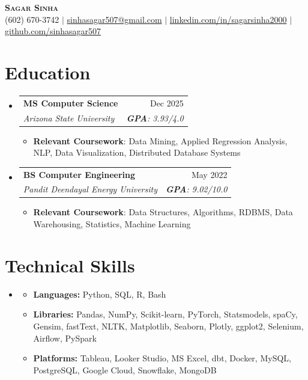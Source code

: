 \documentclass[letterpaper,9pt]{article}
\makeatletter
\newcommand{\resumeItem}[1]{
  \item\small{
    {#1 \vspace{-2pt}}
  }
}
\newcommand{\resumeSubheading}[4]{
  \vspace{-2pt}\item
    \begin{tabular*}{0.97\textwidth}[t]{l@{\extracolsep{\fill}}r}
      \textbf{#1} & {\small #2} \\
      \textit{\small#3} & \textit{\small #4} \\
    \end{tabular*}\vspace{-7pt}
}
\newcommand{\resumeSubHeadingListStart}{\begin{itemize}[leftmargin=0.15in, label={}]}
\newcommand{\resumeSubHeadingListEnd}{\end{itemize}}
\newcommand{\resumeItemListStart}{\begin{itemize}}
\newcommand{\resumeItemListEnd}{\end{itemize}\vspace{-5pt}}
\makeatother
\begin{document}
\vspace*{-10pt} 
\begin{center}
    \textbf{\Huge \scshape Sagar Sinha} \\ \vspace{4pt}
    \small (602) 670-3742 $|$
    \href{mailto:sinhasagar507@gmail.com}{sinhasagar507@gmail.com} $|$
    \href{https://linkedin.com/in/sagarsinha2000}{linkedin.com/in/sagarsinha2000} $|$
    \href{https://github.com/sinhasagar507}{github.com/sinhasagar507}
\end{center}

\section{Education}
  \resumeSubHeadingListStart
    \resumeSubheading
      {MS Computer Science}{Dec 2025}
      {Arizona State University}{\textbf{GPA}: 3.93/4.0}
      \resumeItemListStart
        \resumeItem{\textbf{Relevant Coursework}: Data Mining, Applied Regression Analysis, NLP, Data Visualization, Distributed Database Systems}
      \resumeItemListEnd

    \resumeSubheading
      {BS Computer Engineering}{May 2022}
      {Pandit Deendayal Energy University}{\textbf{GPA}: 9.02/10.0}
      \resumeItemListStart
        \resumeItem{\textbf{Relevant Coursework}: Data Structures, Algorithms, RDBMS, Data Warehousing, Statistics, Machine Learning}
      \resumeItemListEnd
  \resumeSubHeadingListEnd

\section{Technical Skills}
  \resumeSubHeadingListStart
    \item
      \resumeItemListStart
        \resumeItem{\textbf{Languages:} Python, SQL, R, Bash}
        \resumeItem{\textbf{Libraries:} Pandas, NumPy, Scikit-learn, PyTorch, Statsmodels, spaCy, Gensim, fastText, NLTK, Matplotlib, Seaborn, Plotly, ggplot2, Selenium, Airflow, PySpark}
        \resumeItem{\textbf{Platforms:} Tableau, Looker Studio, MS Excel, dbt, Docker, MySQL, PostgreSQL, Google Cloud, Snowflake, MongoDB}
      \resumeItemListEnd
  \resumeSubHeadingListEnd

\end{document}
